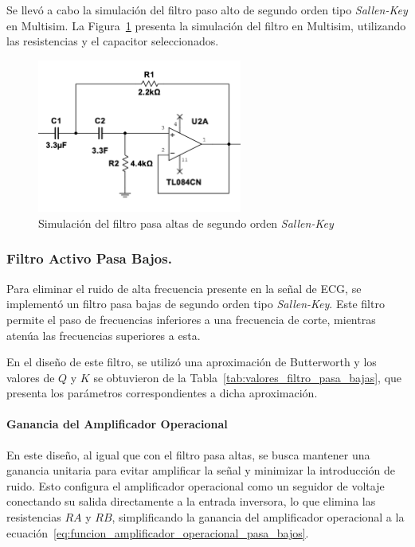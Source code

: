         Se llevó a cabo la simulación del filtro paso alto de segundo orden tipo \textit{Sallen-Key} en Multisim. La Figura~\ref{fig:Simulacion_Filtro_Pasa_Altas} presenta la simulación del filtro en Multisim, utilizando las resistencias y el capacitor seleccionados.

        \begin{figure}[H]
            \centering
            \includegraphics[width=0.6\textwidth]{img/Desarrollo/multisim_pasaAltos.png}
            \caption[Simulación del filtro pasa altas de segundo orden \textit{Sallen-Key}.]{Simulación del filtro pasa altas de segundo orden \textit{Sallen-Key}\footnotemark}
            \label{fig:Simulacion_Filtro_Pasa_Altas}
        \end{figure}

        \subsubsection{Filtro Activo Pasa Bajos.}
        Para eliminar el ruido de alta frecuencia presente en la señal de ECG, se implementó un filtro pasa bajas de segundo orden tipo \textit{Sallen-Key}. Este filtro permite el paso de frecuencias inferiores a una frecuencia de corte, mientras atenúa las frecuencias superiores a esta.

        En el diseño de este filtro, se utilizó una aproximación de Butterworth y los valores de $Q$ y $K$ se obtuvieron de la Tabla~\ref{tab:valores_filtro_pasa_bajas}, que presenta los parámetros correspondientes a dicha aproximación.

        \paragraph{Ganancia del Amplificador Operacional}
        En este diseño, al igual que con el filtro pasa altas, se busca mantener una ganancia unitaria para evitar amplificar la señal y minimizar la introducción de ruido.
        Esto configura el amplificador operacional como un seguidor de voltaje conectando su salida directamente a la entrada inversora, lo que elimina las resistencias $RA$ y $RB$, simplificando la ganancia del amplificador operacional a la ecuación~\ref{eq:funcion_amplificador_operacional_pasa_bajos}.

